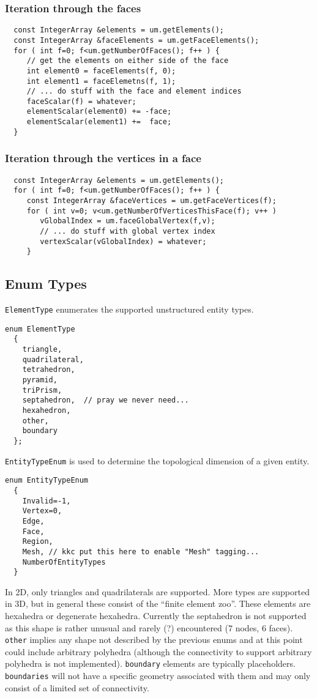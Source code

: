 \subsubsection{Iteration through the faces}
{\footnotesize
\begin{verbatim}
  const IntegerArray &elements = um.getElements();
  const IntegerArray &faceElements = um.getFaceElements();
  for ( int f=0; f<um.getNumberOfFaces(); f++ ) {
     // get the elements on either side of the face
     int element0 = faceElements(f, 0);
     int element1 = faceElemetns(f, 1);
     // ... do stuff with the face and element indices
     faceScalar(f) = whatever;
     elementScalar(element0) += -face;
     elementScalar(element1) +=  face;
  }
\end{verbatim}
}
\subsubsection{Iteration through the vertices in a face}
{\footnotesize
\begin{verbatim}
  const IntegerArray &elements = um.getElements();
  for ( int f=0; f<um.getNumberOfFaces(); f++ ) {
     const IntegerArray &faceVertices = um.getFaceVertices(f);
     for ( int v=0; v<um.getNumberOfVerticesThisFace(f); v++ )
        vGlobalIndex = um.faceGlobalVertex(f,v);
        // ... do stuff with global vertex index
        vertexScalar(vGlobalIndex) = whatever;
     }
\end{verbatim}
}

\subsection{Enum Types}
{\tt ElementType} enumerates the supported unstructured entity types.
{\footnotesize
\begin{verbatim}
enum ElementType 
  {
    triangle,
    quadrilateral,
    tetrahedron,
    pyramid,
    triPrism,
    septahedron,  // pray we never need...
    hexahedron,
    other,
    boundary
  };
\end{verbatim}
}
{\tt EntityTypeEnum} is used to determine the topological dimension of a given
entity.  
{\footnotesize
\begin{verbatim}
enum EntityTypeEnum
  {
    Invalid=-1,
    Vertex=0,
    Edge,
    Face,
    Region,
    Mesh, // kkc put this here to enable "Mesh" tagging...
    NumberOfEntityTypes
  }
\end{verbatim}
}

\noindent
In 2D, only triangles and quadrilaterals are supported.  More types are supported
in 3D, but in general these consist of the ``finite element zoo''.  These elements are
hexahedra or degenerate hexahedra.  Currently the septahedron is not supported as this 
shape is rather unusual and rarely (?) encountered (7 nodes, 6 faces). {\tt other} 
implies any shape not described by the previous enums and at this point could
include arbitrary polyhedra (although the connectivity to support arbitrary 
polyhedra is not implemented).  {\tt boundary} elements are typically placeholders.
{\tt boundaries} will not have a specific geometry associated with them and
may only consist of a limited set of connectivity.

